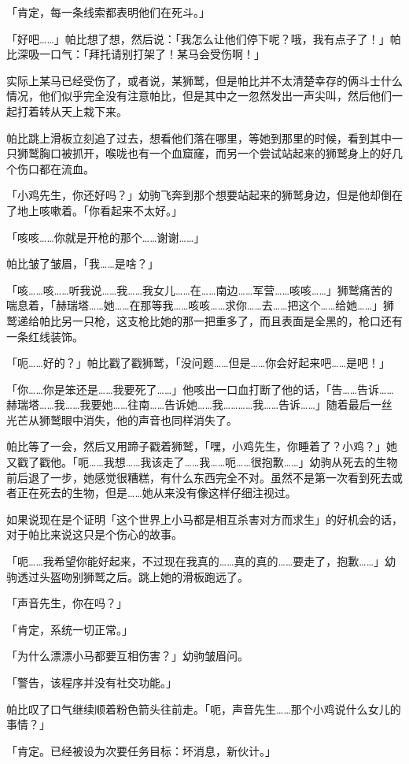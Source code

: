 「{\mt 肯定，每一条线索都表明他们在死斗。}」

「好吧……」帕比想了想，然后说：「我怎么让他们停下呢？哦，我有点子了！」帕比深吸一口气：「拜托请别打架了！某马会受伤啊！」

实际上某马已经受伤了，或者说，某狮鹫，但是帕比并不太清楚幸存的俩斗士什么情况，他们似乎完全没有注意帕比，但是其中之一忽然发出一声尖叫，然后他们一起打着转从天上栽下来。

帕比跳上滑板立刻追了过去，想看他们落在哪里，等她到那里的时候，看到其中一只狮鹫胸口被抓开，喉咙也有一个血窟窿，而另一个尝试站起来的狮鹫身上的好几个伤口都在流血。

「小鸡先生，你还好吗？」幼驹飞奔到那个想要站起来的狮鹫身边，但是他却倒在了地上咳嗽着。「你看起来不太好。」

「咳咳……你就是开枪的那个……谢谢……」

帕比皱了皱眉，「我……是啥？」

「咳……咳……听我说……我……我女儿……在……南边……军营……咳咳……」狮鹫痛苦的喘息着，「赫瑞塔……她……在那等我……咳咳……求你……去……把这个……给她……」狮鹫递给帕比另一只枪，这支枪比她的那一把重多了，而且表面是全黑的，枪口还有一条红线装饰。

「呃……好的？」帕比戳了戳狮鹫，「没问题……但是……你会好起来吧……是吧！」

「你……你是笨还是……我要死了……」他咳出一口血打断了他的话，「告……告诉……赫瑞塔……我……我要她……往南……告诉她……我…………我……告诉……」随着最后一丝光芒从狮鹫眼中消失，他的声音也同样消失了。

帕比等了一会，然后又用蹄子戳着狮鹫，「嘿，小鸡先生，你睡着了？小鸡？」她又戳了戳他。「呃……我想……我该走了……我……呃……很抱歉……」幼驹从死去的生物前后退了一步，她感觉很糟糕，有什么东西完全不对。虽然不是第一次看到死去或者正在死去的生物，但是……她从来没有像这样仔细注视过。

如果说现在是个证明「这个世界上小马都是相互杀害对方而求生」的好机会的话，对于帕比来说这只是个伤心的故事。

「呃……我希望你能好起来，不过现在我真的……真的真的……要走了，抱歉……」幼驹透过头盔吻别狮鹫之后。跳上她的滑板跑远了。

「声音先生，你在吗？」

「{\mt 肯定，系统一切正常。}」

「为什么漂漂小马都要互相伤害？」幼驹皱眉问。

「{\mt 警告，该程序并没有社交功能。}」

帕比叹了口气继续顺着粉色箭头往前走。「呃，声音先生……那个小鸡说什么女儿的事情？」

「{\mt 肯定。已经被设为次要任务目标：坏消息，新伙计。}」

